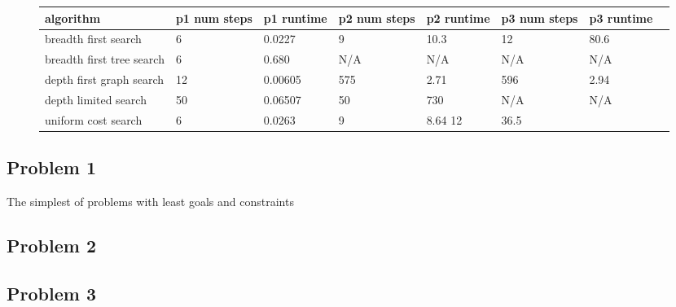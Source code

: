 \documentclass[11pt]{article}
\begin{document}
\begin{figure}
	\begin{tabular}{|p{2cm}|| p{1.3cm} p{1.3cm} p{1.3cm} p{1.3cm} p{1.3cm} p{1.3cm} p{1.3cm}|} 
		\hline
		algorithm & p1 num steps & p1 runtime & p2 num steps & p2 runtime & p3 num steps & p3 runtime \\
		\hline
		\hline
		breadth first search & 6 & 0.0227 & 9 & 10.3 & 12 & 80.6  \\
		\hline
		breadth first tree search & 6 & 0.680 & N/A & N/A & N/A & N/A  \\
		\hline
		depth first graph search & 12 & 0.00605 & 575 & 2.71 & 596 & 2.94  \\
		\hline
		depth limited search & 50 & 0.06507 & 50 & 730 & N/A & N/A  \\
		\hline
		uniform cost search & 6 & 0.0263 & 9 & 8.64 12 & 36.5  \\
		\hline
	\end{tabular}
	
\end{figure}

\subsection{Problem 1}
The simplest of problems with least goals and constraints

\subsection{Problem 2}

\subsection{Problem 3}
\end{document}
